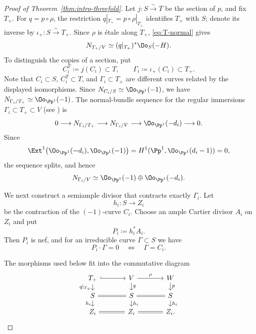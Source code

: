 \documentclass[12pt]{amsart}
\begin{document}
\begin{proof}[Proof of Theorem~\ref{thm:intro-threefold}]
Let $j\colon S\xrightarrow{\sim}T$ be the section of $p$, and fix $T_+$. For $q=p \circ \rho$, the restriction $q|_{T_+}=p\circ\rho|_{T_+}$ identifies $T_+$ with $S$; denote its inverse by $\iota_+\colon S\xrightarrow{\sim}T_+$. Since $\rho$ is étale along $T_+$, \eqref{eq:T-normal} gives
\begin{equation}\label{eq:Tplus-normal}
 N_{T_+/V}\simeq(q|_{T_+})^*\Oo_S(-H).
\end{equation}
To distinguish the copies of a section, put
\[
 C_i^T\coloneqq j(C_i)\subset T,
 \qquad
 \Gamma_i\coloneqq\iota_+(C_i)\subset T_+.
\]
Note that $C_i\subset S$, $C_i^T\subset T$, and $\Gamma_i\subset T_+$ are different curves related by the displayed isomorphisms. Since $N_{C_i/S}\simeq\Oo_{\Pp^1}(-1)$, we have $N_{\Gamma_i/T_+}\simeq\Oo_{\Pp^1}(-1)$. The normal-bundle sequence for the regular immersions $\Gamma_i\subset T_+\subset V$ (see \cite[\href{https://stacks.math.columbia.edu/tag/063N}{Tag~063N}]{Stacks}) is
\[
 0\longrightarrow N_{\Gamma_i/T_+}
 \longrightarrow N_{\Gamma_i/V}
 \longrightarrow\Oo_{\Pp^1}(-d_i)
 \longrightarrow0.
\]
Since
\[
 \Ext^1\bigl(\Oo_{\Pp^1}(-d_i),\Oo_{\Pp^1}(-1)\bigr)
 =H^1(\Pp^1,\Oo_{\Pp^1}(d_i-1))=0,
\]
the sequence splits, and hence
\begin{equation}\label{eq:normal-Ci-V}
 N_{\Gamma_i/V}
 \simeq
 \Oo_{\Pp^1}(-1)\oplus\Oo_{\Pp^1}(-d_i).
\end{equation}

We next construct a semiample divisor that contracts exactly $\Gamma_i$. Let
\[
 h_i\colon S\to Z_i
\]
be the contraction of the $(-1)$-curve $C_i$. Choose an ample Cartier divisor $A_i$ on $Z_i$ and put
\[
 P_i\coloneqq h_i^*A_i.
\]
Then $P_i$ is nef, and for an irreducible curve $\Gamma\subset S$ we have
\begin{equation}\label{eq:Pi-zero-curves}
 P_i\cdot\Gamma=0
 \quad\Longleftrightarrow\quad
 \Gamma=C_i.
\end{equation}

The morphisms used below fit into the commutative diagram
\[
\begin{tikzcd}[column sep=large,row sep=small]
T_+ \arrow[r,hook] \arrow[d,"q|_{T_+}"'] &
V \arrow[r,"\rho"] \arrow[d,"q"] &
W \arrow[d,"p"]\\
S \arrow[r,equal] \arrow[d,"h_i"'] &
S \arrow[r,equal] \arrow[d,"h_i"] &
S \arrow[d,"h_i"]\\
Z_i \arrow[r,equal] & Z_i \arrow[r,equal] & Z_i.
\end{tikzcd}
\]


\end{proof}
\end{document}
